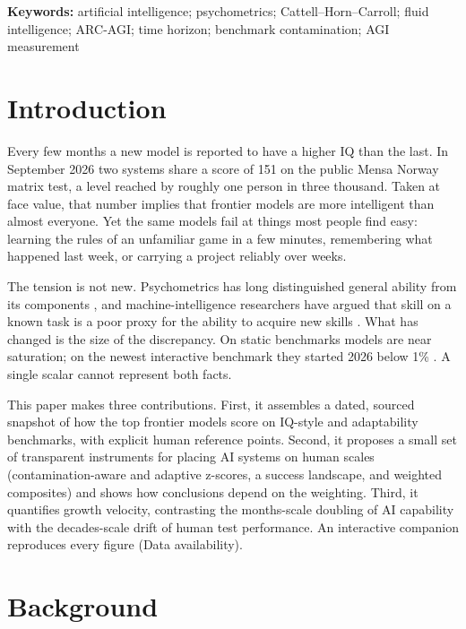 \documentclass[11pt]{article}
\begin{document}
\noindent\textbf{Keywords:} artificial intelligence; psychometrics; Cattell--Horn--Carroll; fluid intelligence; ARC-AGI; time horizon; benchmark contamination; AGI measurement

\section{Introduction}
Every few months a new model is reported to have a higher IQ than the last. In September 2026 two systems share a score of 151 on the public Mensa Norway matrix test, a level reached by roughly one person in three thousand. Taken at face value, that number implies that frontier models are more intelligent than almost everyone. Yet the same models fail at things most people find easy: learning the rules of an unfamiliar game in a few minutes, remembering what happened last week, or carrying a project reliably over weeks.

The tension is not new. Psychometrics has long distinguished general ability from its components \citep{spearman1904,cattell1963,carroll1993}, and machine-intelligence researchers have argued that skill on a known task is a poor proxy for the ability to acquire new skills \citep{chollet2019,legg2007,hernandez2017}. What has changed is the size of the discrepancy. On static benchmarks models are near saturation; on the newest interactive benchmark they started 2026 below 1\% \citep{arcagi3}. A single scalar cannot represent both facts.

This paper makes three contributions. First, it assembles a dated, sourced snapshot of how the top frontier models score on IQ-style and adaptability benchmarks, with explicit human reference points. Second, it proposes a small set of transparent instruments for placing AI systems on human scales (contamination-aware and adaptive z-scores, a success landscape, and weighted composites) and shows how conclusions depend on the weighting. Third, it quantifies growth velocity, contrasting the months-scale doubling of AI capability with the decades-scale drift of human test performance. An interactive companion reproduces every figure (Data availability).

\section{Background}
\end{document}
